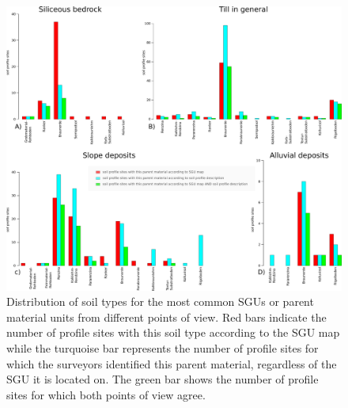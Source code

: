 \documentclass[preprint,12pt,authoryear]{elsarticle}
\begin{document}
 \begin{figure}[ht!]
\includegraphics[width=\textwidth,angle=0]{soildistro_ohneleerebalken.pdf}
\caption{Distribution of soil types for the most common SGUs or parent material units from different points of view. Red bars indicate the number of profile sites with this soil type according to the SGU map while the turquoise bar represents the number of profile sites for which the surveyors identified this parent material, regardless of the SGU it is located on. The green bar shows the number of profile sites for which both points of view agree.}
\label{fig:soilbars}
\end{figure}
\end{document}
